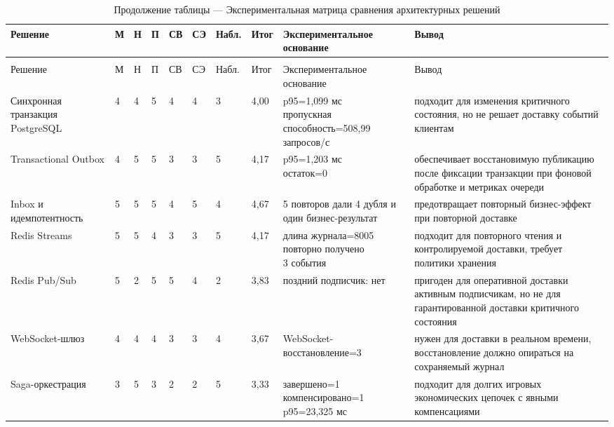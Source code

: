 \documentclass[a4paper,14pt]{extarticle}
\makeatletter
\newcommand{\tablefont}{\scriptsize}
\newcommand{\cellstack}[1]{\begin{tabular}[t]{@{}l@{}}#1\end{tabular}}
\renewcommand{\toprule}{\hline}
\renewcommand{\midrule}{\hline}
\renewcommand{\bottomrule}{\hline}
\numberwithin{figure}{section}
\numberwithin{table}{section}
\makeatother
\begin{document}
\begingroup
\tablefont
\setlength{\tabcolsep}{1pt}
\renewcommand{\arraystretch}{1.12}
\begin{longtable}{|L{2.5cm}|C{0.75cm}|C{0.75cm}|C{0.75cm}|C{0.75cm}|C{0.75cm}|C{0.75cm}|C{0.75cm}|L{3.1cm}|L{3.3cm}|}
\caption{Экспериментальная матрица сравнения архитектурных решений}
\label{tab:comparison-main} \\
\toprule
Решение & М & Н & П & СВ & СЭ & Набл. & Итог & Экспериментальное основание & Вывод \\
\midrule
\endfirsthead
\caption*{Продолжение таблицы \thetable{} --- Экспериментальная матрица сравнения архитектурных решений} \\
\toprule
Решение & М & Н & П & СВ & СЭ & Набл. & Итог & Экспериментальное основание & Вывод \\
\midrule
\endhead
\bottomrule
\endfoot
Синхронная транзакция PostgreSQL & 4 & 4 & 5 & 4 & 4 & 3 & 4,00 & \cellstack{p95=1,099 мс\\пропускная\\способность=508,99\\запросов/с} & подходит для изменения критичного состояния, но не решает доставку событий клиентам \\
\hline
Transactional Outbox & 4 & 5 & 5 & 3 & 3 & 5 & 4,17 & \cellstack{p95=1,203 мс\\остаток=0} & обеспечивает восстановимую публикацию после фиксации транзакции при фоновой обработке и метриках очереди \\
\hline
Inbox и идемпотентность & 5 & 5 & 5 & 4 & 5 & 4 & 4,67 & 5 повторов дали 4 дубля и один бизнес-результат & предотвращает повторный бизнес-эффект при повторной доставке \\
\hline
Redis Streams & 5 & 5 & 4 & 3 & 3 & 5 & 4,17 & \cellstack{длина журнала=8005\\повторно получено\\3 события} & подходит для повторного чтения и контролируемой доставки, требует политики хранения \\
\hline
Redis Pub/Sub & 5 & 2 & 5 & 5 & 4 & 2 & 3,83 & поздний подписчик: нет & пригоден для оперативной доставки активным подписчикам, но не для гарантированной доставки критичного состояния \\
\hline
WebSocket-шлюз & 4 & 4 & 4 & 3 & 3 & 4 & 3,67 & WebSocket-восстановление=3 & нужен для доставки в реальном времени, восстановление должно опираться на сохраняемый журнал \\
\hline
Saga-оркестрация & 3 & 5 & 3 & 2 & 2 & 5 & 3,33 & \cellstack{завершено=1\\компенсировано=1\\p95=23,325 мс} & подходит для долгих игровых экономических цепочек с явными компенсациями \\

\end{longtable}
\end{document}
